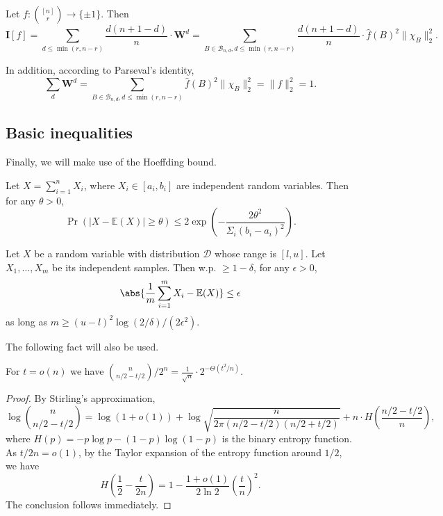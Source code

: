 \documentclass{toc}
\newcommand{\W}{\mathbf{W}}
\newcommand{\I}{\mathbf{I}}
\newcommand{\warn}[1]{#1}
\begin{document}
%
\begin{theorem}\label{slice_inf} %
Let $f:
%
\binom{[n]}{r} %
\rightarrow \{\pm1\}$. Then
%
\begin{equation} %
\I[f]=\sum_{d \leq \min(r,n-r)}\frac{d(n+1-d)}{n} \cdot \W^d
 = \sum_{B\in \mathcal{B}_{n,d}, d \leq \min(r,n-r)}\frac{d(n+1-d)}{n} \cdot \hat{f}(B)^2\| \chi_B\|_2^2.
%
\end{equation} %

In addition, according to Parseval's identity,
%
\begin{equation} %
\sum_d \W^d = \sum_{B\in \mathcal{B}_{n,d},d\leq \min(r,n-r)}\hat{f}(B)^2\| \chi_B\|_2^2=\| f\|_2^2=1.
%
\end{equation} %
\end{theorem}

\subsection{Basic inequalities}
Finally, we will make use of the Hoeffding bound.
%
%
\begin{theorem} %
	Let $X=\sum_{i=1}^{n}X_i$, where $X_i\in[a_i,b_i]$ are independent random variables. Then for any $\theta>0$,
\begin{equation} %
\Pr(|X-\mathbb{E}(X)|\geq \theta)\leq 2\exp\left(-\frac{2\theta^2}{\Sigma_{i}(b_i-a_i)^2}\right).
%
\end{equation} %
\end{theorem}

\begin{corollary}\label{Coro:Heff}
  Let $X$ be a random variable with distribution $\mathcal{D}$ whose range is $[l,u]$. Let $X_1,\ldots,X_m$ be its independent samples. Then w.p.
%
$\ge 1-\delta$,  %
for any $\epsilon>0$,
\begin{equation} %
\abs{\frac{1}{m}\sum_{i=1}^{m}X_i-\mathbb{E}(X)}\leq \epsilon
%
\end{equation} %
	as long as $m\geq (u-l)^2\log(2/\delta)/(2\epsilon^2)$.
\end{corollary}

\warn{
The following fact will also be used.
\begin{proposition}\label{prop:binomial}
For
%
%
$t=o(n)$ we have  %
%
$\binom{n}{n/2-t/2}/2^n %
=\frac{1}{\sqrt{n}}\cdot 2^{-\Theta(t^2/n)}$.
%
\end{proposition}
\begin{proof}
By Stirling's approximation,
%
\begin{equation} %
\log %
\binom{n}{n/2-t/2} %
=\log(1+o(1))+\log\sqrt{\frac{n}{2\pi(n/2-t/2)(n/2+t/2)}}+n\cdot H\left(\frac{n/2-t/2}{n}\right),
%
\end{equation} %
where $H(p)=-p\log p-(1-p)\log(1-p)$ is the binary entropy function.
As $t/2n=o(1)$, by the Taylor expansion of the entropy function around $1/2$, we have 
%
\begin{equation} %
H\left(\frac{1}{2}-\frac{t}{2n}\right)=1-\frac{1+o(1)}{2\ln 2}\left(\frac{t}{n}\right)^2.
%
\end{equation} %
The conclusion follows immediately.
\end{proof}
}
\end{document}
